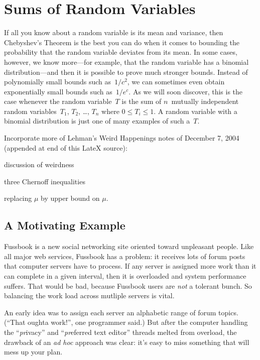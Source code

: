 \section{Sums of Random Variables}

If all you know about a random variable is its mean and variance, then
Chebyshev's Theorem is the best you can do when it comes to bounding
the probability that the random variable deviates from its mean.  In
some cases, however, we know more---for example, that the random
variable has a binomial distribution---and then it is possible to
prove much stronger bounds.  Instead of polynomially small bounds such
as~$1/c^2$, we can sometimes even obtain exponentially small bounds
such as~$1/e^c$.  As we will soon discover, this is the case whenever
the random variable~$T$ is the sum of $n$~mutually independent random
variables~$T_1$, $T_2$, \dots, $T_n$ where $0 \le T_i \le 1$.  A
random variable with a binomial distribution is just one of many
examples of such a~$T$.  

\begin{editingnotes}
Incorporate more of Lehman's Weird Happenings notes of December 7,
2004 (appended at end of this LateX source):

discussion of weirdness

three Chernoff inequalities

replacing $\mu$ by upper bound on $\mu$.

\end{editingnotes}


\subsection{A Motivating Example}

Fussbook is a new social networking site oriented toward unpleasant
people.  Like all major web services, Fussbook has a  problem: it receives lots of forum posts that computer
servers have to process.  If any server is assigned more work than it
can complete in a given interval, then it is overloaded and system
performance suffers.  That would be bad, because Fussbook users are
\emph{not} a tolerant bunch.  So balancing the work load across
mutliple servers is vital.

An early idea was to assign each server an alphabetic range of forum
topics.  (``That oughta work!'', one programmer said.)  But after the
computer handling the ``\emph{pr}ivacy'' and ``\emph{pr}eferred text
editor'' threads melted from overload, the drawback of an \emph{ad
  hoc} approach was clear: it's easy to miss something that will mess
up your plan.

